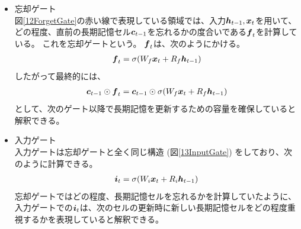 \begin{itemize}
  \item 忘却ゲート\\
  図\ref{12ForgetGate}の赤い線で表現している領域では、入力${\mbox{\boldmath{$h$}}}_{t-1},{\mbox{\boldmath{$x$}}}_t$を用いて、どの程度、直前の長期記憶セル${\mbox{\boldmath{$c$}}}_{t-1}$を忘れるかの度合いである${\mbox{\boldmath{$f$}}}_{t}$を計算している。
  これを忘却ゲートという。
  ${\mbox{\boldmath{$f$}}}_{t}$は、次のようにかける。
\begin{equation}
 \begin{split}
  {\mbox{\boldmath{$f$}}}_{t} = \sigma (W_f {\mbox{\boldmath{$x$}}}_t + R_f {\mbox{\boldmath{$h$}}}_{t-1})
 \end{split}
\end{equation}  
  したがって最終的には、
\begin{equation}
 \begin{split}
  {\mbox{\boldmath{$c$}}}_{t-1} \odot {\mbox{\boldmath{$f$}}}_{t} 
  = {\mbox{\boldmath{$c$}}}_{t-1} \odot \sigma (W_f {\mbox{\boldmath{$x$}}}_t + R_f {\mbox{\boldmath{$h$}}}_{t-1})
 \end{split}
\end{equation}
  として、次のゲート以降で長期記憶を更新するための容量を確保していると解釈できる。

  \item 入力ゲート\\
  入力ゲートは忘却ゲートと全く同じ構造 (図\ref{13InputGate}) をしており、次のように計算できる。
\begin{equation}
 \begin{split}
  {\mbox{\boldmath{$i$}}}_{t} = \sigma (W_i {\mbox{\boldmath{$x$}}}_t + R_i {\mbox{\boldmath{$h$}}}_{t-1})
 \end{split}
\end{equation}
  忘却ゲートではどの程度、長期記憶セルを忘れるかを計算していたように、入力ゲートでの${\mbox{\boldmath{$i$}}}_{t}$は、次のセルの更新時に新しい長期記憶セルをどの程度重視するかを表現していると解釈できる。
    

\end{itemize}
